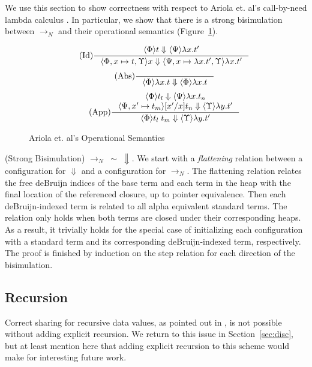 We use this section to show correctness with respect to Ariola et. al's
call-by-need lambda calculus \cite{ariola1995call}. In particular, we show that
there is a strong bisimulation between $\rightarrow_{N}$ and their operational
semantics (Figure~\ref{fig:cbn}). 

\begin{figure}
\begin{align*}
\tag{Id} \inference
{\langle \Phi \rangle t \Downarrow \langle \Psi \rangle \lambda x.t'}
{\langle \Phi, x \mapsto t, \Upsilon \rangle x \Downarrow \langle \Psi, x
\mapsto \lambda x.t', \Upsilon \rangle \lambda x.t'}
\end{align*}
\begin{align*}
\tag{Abs} \inference 
{}
{\langle \Phi \rangle \lambda x . t \Downarrow \langle \Phi \rangle \lambda x.t}
\end{align*}
\begin{align*}
\tag{App} \inference
{\langle \Phi \rangle t_l \Downarrow \langle \Psi \rangle \lambda 
x.t_n \\ \langle \Psi, x' \mapsto t_m \rangle [x'/x]t_n \Downarrow \langle
\Upsilon \rangle \lambda y.t'}
{\langle \Phi \rangle t_l \; t_m \Downarrow \langle \Upsilon \rangle \lambda y.t'}
\end{align*}
\caption{Ariola et. al's Operational Semantics}
\label{fig:cbn}
\end{figure}

{\theorem \textnormal{(Strong Bisimulation)} $\xrightarrow{}_{N} \; \sim \; \Downarrow$.}
We start with a \emph{flattening} relation between a configuration for
$\Downarrow$ and a configuration for $\xrightarrow{}_{N}$. The flattening
relation relates the free deBruijn indices of the base term and each term in
the heap with the final location of the referenced closure, up to pointer
equivalence. Then each deBruijn-indexed term is related to all alpha equivalent
standard terms. The relation only holds when both terms are closed under their
corresponding heaps. As a result, it trivially holds for the special case of
initializing each configuration with a standard term and its corresponding
deBruijn-indexed term, respectively. The proof is finished by induction on the
step relation for each direction of the bisimulation.

\subsection{Recursion}

Correct sharing for recursive data values, as pointed out in
\cite{ariola1995call}, is not possible without adding explicit recursion. We
return to this issue in Section~\ref{sec:disc}, but at least mention here that
adding explicit recursion to this scheme would make for interesting future work.
